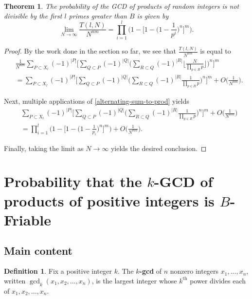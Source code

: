 \documentclass[10pt,a4paper]{article}
\newtheorem{theorem}{Theorem}[section]
\theoremstyle{definition}
\newtheorem{definition}{Definition}[section]
\theoremstyle{remark}
\begin{document}
\begin{theorem} The probability of the GCD of products of random integers is not divisible by the first $l$ primes greater than $B$ is given by 
$$\lim_{N\to\infty} \frac{T(l,N)}{N^{nm}} = \prod_{i=1}^{l} \Big(1 - \Big[1 - \Big(1-\frac{1}{p^i}\Big)^n\Big]^m\Big).$$
\end{theorem}

\begin{proof}
By the work done in the section so far, we see that $\displaystyle \frac{T(l,N)}{N^{nm}}$ is equal to 
 \begin{align}
&\frac{1}{N^{nm}}\sum_{P\subset X_l}{(-1)^{|P|}}\Big[\sum_{Q\subset P}(-1)^{|Q|}\Big(\sum_{R\subset Q}(-1)^{|R|}\Big\lfloor\frac{N}{\prod_{p\in R} p} \Big\rfloor\Big)^n\Big]^m\\
&= \sum_{P\subset X_l}{(-1)^{|P|}} \Big[\sum_{Q\subset P}(-1)^{|Q|} \Big(\sum_{R\subset Q}(-1)^{|R|} \frac{1}{\prod_{p\in R} p}\Big)^n\Big]^m+O\Big(\frac{1}{N^{nm}}\Big).
\end{align}

\noindent Next, multiple applications of \cref{alternating-sum-to-prod} yields
\begin{align}
&\sum_{P\subset X_l}{(-1)^{|P|}} \Big[\sum_{Q\subset P}(-1)^{|Q|} \Big(\sum_{R\subset Q}(-1)^{|R|}\frac{1}{\prod_{p\in R} p}\Big)^n \Big]^m + O\Big(\frac{1}{N^{nm}}\Big)\\ &= \prod_{i=1}^{l} \Big(1 - \Big[1 - \Big(1 - \frac{1}{p_i}\Big)^n\Big]^m \Big) + O\Big(\frac{1}{N^{mn}}\Big). 
\end{align}
	
\noindent Finally, taking the limit as $N \to \infty$ yields the desired conclusion.
\end{proof}

\section{Probability that the \texorpdfstring{\(k\)}{}-GCD of products of positive integers is  \texorpdfstring{\(B\)}{}-Friable}

\subsection{Main content}

\begin{definition} Fix a positive integer $k$. The \textbf{$k$-gcd} of $n$ nonzero integers $x_1, ..., x_n$, written $\gcd_k(x_1,x_2, ...,x_n)$, is the largest integer whose $k^{\text{th}}$ power divides each of $x_1, x_2, ..., x_n$.
\end{definition}	
\end{document}
